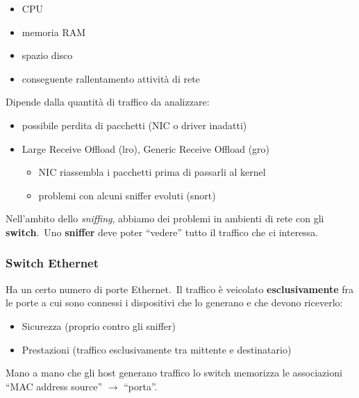\begin{itemize}
    \item CPU
    \item memoria RAM
    \item spazio disco
    \item conseguente rallentamento attività di rete
\end{itemize}
Dipende dalla quantità di traffico da
analizzare:
\begin{itemize}
    \item possibile perdita di pacchetti (NIC o driver inadatti)
    \item Large Receive Offload (lro), Generic Receive Offload (gro)
          \begin{itemize}
              \item NIC riassembla i pacchetti prima di passarli al kernel
              \item problemi con alcuni sniffer evoluti (snort)
          \end{itemize}
\end{itemize}
Nell’ambito dello \emph{sniffing}, abbiamo dei problemi in ambienti di rete con gli \textbf{switch}.\
Uno \textbf{sniffer} deve poter ``vedere'' tutto il traffico che ci interessa.

\subsubsection{Switch Ethernet}

Ha un certo numero di porte Ethernet.\
Il traffico è veicolato \textbf{esclusivamente} fra le porte a cui sono connessi i dispositivi che lo generano e che devono riceverlo:
\begin{itemize}
    \item Sicurezza (proprio contro gli sniffer)
    \item Prestazioni (traffico esclusivamente tra mittente e destinatario)
\end{itemize}
Mano a mano che gli host generano traffico lo switch memorizza le associazioni ``MAC address source'' $\rightarrow$ ``porta''.\


